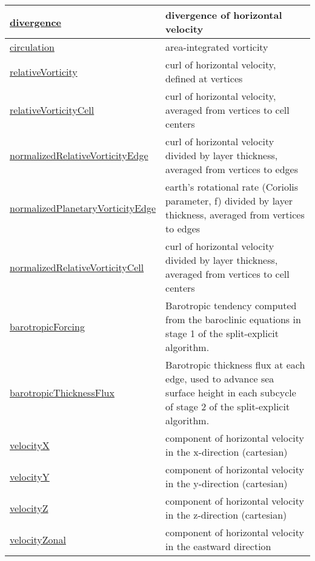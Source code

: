 {\begin{center}
\begin{longtable}{| p{2.0in} | p{4.0in} |}
    \hline
    \hyperref[subsec:var_sec_diagnostics_divergence]{divergence} & divergence of horizontal velocity \\
    \hline
    \hyperref[subsec:var_sec_diagnostics_circulation]{circulation} & area-integrated vorticity \\
    \hline
    \hyperref[subsec:var_sec_diagnostics_relativeVorticity]{relativeVorticity} & curl of horizontal velocity, defined at vertices \\
    \hline
    \hyperref[subsec:var_sec_diagnostics_relativeVorticityCell]{relativeVorticityCell} & curl of horizontal velocity, averaged from vertices to cell centers \\
    \hline
    \hyperref[subsec:var_sec_diagnostics_normalizedRelativeVorticityEdge]{normalizedRelativeVorticityEdge} & curl of horizontal velocity divided by layer thickness, averaged from vertices to edges \\
    \hline
    \hyperref[subsec:var_sec_diagnostics_normalizedPlanetaryVorticityEdge]{normalizedPlanetaryVorticity\-Edge} & earth's rotational rate (Coriolis parameter, f) divided by layer thickness, averaged from vertices to edges \\
    \hline
    \hyperref[subsec:var_sec_diagnostics_normalizedRelativeVorticityCell]{normalizedRelativeVorticityCell} & curl of horizontal velocity divided by layer thickness, averaged from vertices to cell centers \\
    \hline
    \hyperref[subsec:var_sec_diagnostics_barotropicForcing]{barotropicForcing} & Barotropic tendency computed from the baroclinic equations in stage 1 of the split-explicit algorithm. \\
    \hline
    \hyperref[subsec:var_sec_diagnostics_barotropicThicknessFlux]{barotropicThicknessFlux} & Barotropic thickness flux at each edge, used to advance sea surface height in each subcycle of stage 2 of the split-explicit algorithm. \\
    \hline
    \hyperref[subsec:var_sec_diagnostics_velocityX]{velocityX} & component of horizontal velocity in the x-direction (cartesian) \\
    \hline
    \hyperref[subsec:var_sec_diagnostics_velocityY]{velocityY} & component of horizontal velocity in the y-direction (cartesian) \\
    \hline
    \hyperref[subsec:var_sec_diagnostics_velocityZ]{velocityZ} & component of horizontal velocity in the z-direction (cartesian) \\
    \hline
    \hyperref[subsec:var_sec_diagnostics_velocityZonal]{velocityZonal} & component of horizontal velocity in the eastward direction \\

\end{longtable}
\end{center}}
